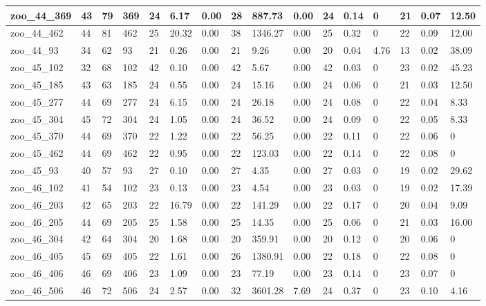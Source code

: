 \begin{landscape}
\begin{longtable}{llllllllllllllll}
zoo\_44\_369 & 43 & 79 & 369 & 24 & 6.17 & 0.00 & 28 & 887.73 & 0.00 & 24 & 0.14 & 0 & 21 & 0.07 & 12.50 \\ \hline 
zoo\_44\_462 & 44 & 81 & 462 & 25 & 20.32 & 0.00 & 38 & 1346.27 & 0.00 & 25 & 0.32 & 0 & 22 & 0.09 & 12.00 \\ \hline 
zoo\_44\_93 & 34 & 62 & 93 & 21 & 0.26 & 0.00 & 21 & 9.26 & 0.00 & 20 & 0.04 & 4.76 & 13 & 0.02 & 38.09 \\ \hline 
zoo\_45\_102 & 32 & 68 & 102 & 42 & 0.10 & 0.00 & 42 & 5.67 & 0.00 & 42 & 0.03 & 0 & 23 & 0.02 & 45.23 \\ \hline 
zoo\_45\_185 & 43 & 63 & 185 & 24 & 0.55 & 0.00 & 24 & 15.16 & 0.00 & 24 & 0.06 & 0 & 21 & 0.03 & 12.50 \\ \hline 
zoo\_45\_277 & 44 & 69 & 277 & 24 & 6.15 & 0.00 & 24 & 26.18 & 0.00 & 24 & 0.08 & 0 & 22 & 0.04 & 8.33 \\ \hline 
zoo\_45\_304 & 45 & 72 & 304 & 24 & 1.05 & 0.00 & 24 & 36.52 & 0.00 & 24 & 0.09 & 0 & 22 & 0.05 & 8.33 \\ \hline 
zoo\_45\_370 & 44 & 69 & 370 & 22 & 1.22 & 0.00 & 22 & 56.25 & 0.00 & 22 & 0.11 & 0 & 22 & 0.06 & 0 \\ \hline 
zoo\_45\_462 & 44 & 69 & 462 & 22 & 0.95 & 0.00 & 22 & 123.03 & 0.00 & 22 & 0.14 & 0 & 22 & 0.08 & 0 \\ \hline 
zoo\_45\_93 & 40 & 57 & 93 & 27 & 0.10 & 0.00 & 27 & 4.35 & 0.00 & 27 & 0.03 & 0 & 19 & 0.02 & 29.62 \\ \hline 
zoo\_46\_102 & 41 & 54 & 102 & 23 & 0.13 & 0.00 & 23 & 4.54 & 0.00 & 23 & 0.03 & 0 & 19 & 0.02 & 17.39 \\ \hline 
zoo\_46\_203 & 42 & 65 & 203 & 22 & 16.79 & 0.00 & 22 & 141.29 & 0.00 & 22 & 0.17 & 0 & 20 & 0.04 & 9.09 \\ \hline 
zoo\_46\_205 & 44 & 69 & 205 & 25 & 1.58 & 0.00 & 25 & 14.35 & 0.00 & 25 & 0.06 & 0 & 21 & 0.03 & 16.00 \\ \hline 
zoo\_46\_304 & 42 & 64 & 304 & 20 & 1.68 & 0.00 & 20 & 359.91 & 0.00 & 20 & 0.12 & 0 & 20 & 0.06 & 0 \\ \hline 
zoo\_46\_405 & 45 & 69 & 405 & 22 & 1.61 & 0.00 & 26 & 1380.91 & 0.00 & 22 & 0.18 & 0 & 22 & 0.08 & 0 \\ \hline 
zoo\_46\_406 & 46 & 69 & 406 & 23 & 1.09 & 0.00 & 23 & 77.19 & 0.00 & 23 & 0.14 & 0 & 23 & 0.07 & 0 \\ \hline 
zoo\_46\_506 & 46 & 72 & 506 & 24 & 2.57 & 0.00 & 32 & 3601.28 & 7.69 & 24 & 0.37 & 0 & 23 & 0.10 & 4.16 \\ \hline 

\end{longtable}
\end{landscape}
